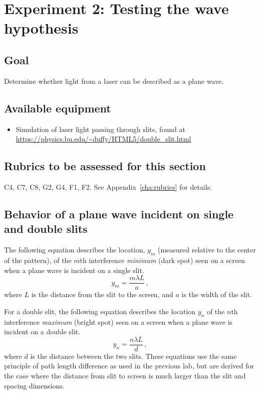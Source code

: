 \section{Experiment 2: Testing the wave hypothesis}\label{lir:sec:exp2}

\subsection{Goal}

Determine whether light from a laser can be described as a plane wave.

\subsection{Available equipment}


\begin{itemize}
	\item Simulation of laser light passing through slits, found at \url{https://physics.bu.edu/~duffy/HTML5/double_slit.html}
\end{itemize}

\subsection{Rubrics to be assessed for this section}

C4, C7, C8, G2, G4, F1, F2. See Appendix~\ref{cha:rubrics} for details.

\subsection{Behavior of a plane wave incident on single and double slits}

The following equation describes the location, $y_m$ (measured relative to the center of the pattern), of the $m$th interference \textit{minimum} (dark spot) seen on a screen when a plane wave is incident on a single slit.
\begin{equation}
y_m = \frac{m \lambda L}{a} \,,
\end{equation}
where $L$ is the distance from the slit to the screen, and $a$ is the width of the slit.

For a double slit, the following equation describes the location $y_n$ of the $n$th interference \textit{maximum} (bright spot) seen on a screen when a plane wave is incident on a double slit.
\begin{equation}
y_n = \frac{n \lambda L}{d} \,,
\end{equation}
where $d$ is the distance between the two slits. These equations use the same principle of path length difference as used in the previous lab, but are derived for the case where the distance from slit to screen is much larger than the slit and spacing dimensions.

